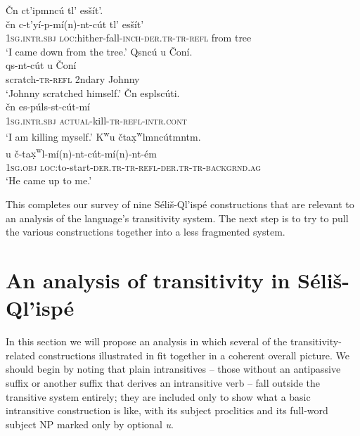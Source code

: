 \documentclass[output=paper,colorlinks,citecolor=brown]{langscibook}
\begin{document}
\ea 
\label{ex-thomason-41}
\v{C}n ct'ipmnc\'u tl' es\v{s}\'it'.  \\
\gll \v{c}n c-t'y\'i-p-m\'i(n)-nt-c\'ut tl' es\v{s}\'it' \\
\textsc{1sg}.\textsc{intr.sbj} \textsc{loc}:hither-fall-\textsc{inch-der.tr-tr-refl} from tree \\
\glt `I came down from the tree.'
\ex 
\label{ex-thomason-42}
Qsnc\'u {\textltilde}u \v{C}on\'i. \\
\gll qs-nt-c\'ut {\textltilde}u \v{C}on\'i \\ 
scratch-\textsc{tr-refl} 2ndary Johnny \\
\glt `Johnny scratched himself.'
\ex 
\label{ex-thomason-43}
\v{C}n esplsc\'uti. \\
\gll \v{c}n es-p\'uls-st-c\'ut-m\'i \\
\textsc{1sg}.\textsc{intr.sbj} \textsc{actual}-kill-\textsc{tr-refl-intr.cont} \\
\glt  `I am killing myself.'
\ex 
\label{ex-thomason-44}
{K\textsuperscript w}u \v{c}ta{\d{x}\textsuperscript w}lmnc\'utmntm. \\
u \v{c}-ta{\d{x}\textsuperscript
 w}l-m\'i(n)-nt-c\'ut-m\'i(n)-nt-\'em \\ 
\textsc{1sg}.\textsc{obj} \textsc{loc}:to-start-\textsc{der.tr-tr-refl-der.tr-tr-backgrnd.ag} \\
\glt `He came up to me.'
\z


This completes our survey of nine S\'eli\v{s}-Ql'isp\'e constructions
that are relevant to an analysis of the language's transitivity
system.  The next step is to try to pull the various constructions
together into a less fragmented system.

\section{An analysis of transitivity in S\'eli\v{s}-Ql'isp\'e}  %
\label{thomason_section_3}

In this section we will propose an analysis in which several of the
transitivity-related constructions illustrated in
 fit
together in a coherent overall picture.  We should begin by noting
that plain intransitives -- those without an antipassive suffix or
another suffix that derives an intransitive verb -- fall outside the
transitive system entirely; they are included only to show what a
basic intransitive construction is like, with its subject proclitics
and its full-word subject NP marked only by optional \emph{{\textltilde}u}.
\end{document}
